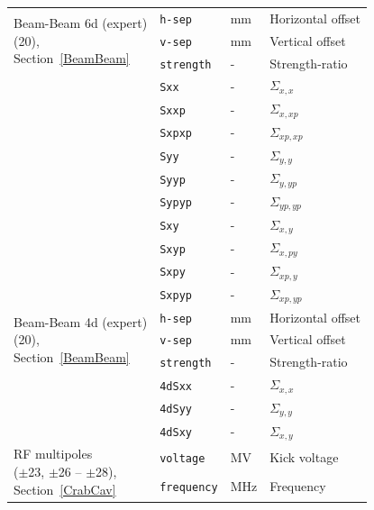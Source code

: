 \begin{longtable}{|l | l | l | p{6cm}|}
   \multirow{3}{*}{\parbox{4cm}{Beam-Beam 6d (expert) \\ (20),\\ Section~\ref{BeamBeam}}}
    & \texttt{h-sep}     & mm      & Horizontal offset \\
    & \texttt{v-sep}     & mm      & Vertical offset \\
    & \texttt{strength}  & -       & Strength-ratio \\
    & \texttt{Sxx}       & -       & $\Sigma_{x,x}$  \\
    & \texttt{Sxxp}      & -       & $\Sigma_{x,xp}$ \\
    & \texttt{Sxpxp}     & -       & $\Sigma_{xp,xp}$  \\
    & \texttt{Syy}       & -       & $\Sigma_{y,y}$ \\
    & \texttt{Syyp}      & -       & $\Sigma_{y,yp}$\\
    & \texttt{Sypyp}     & -       & $\Sigma_{yp,yp}$ \\
    & \texttt{Sxy}       & -       & $\Sigma_{x,y}$ \\
    & \texttt{Sxyp}      & -       & $\Sigma_{x,py}$  \\
    & \texttt{Sxpy}      & -       & $\Sigma_{xp,y}$ \\
    & \texttt{Sxpyp}     & -       & $\Sigma_{xp,yp}$ \\
   \hline
      \multirow{3}{*}{\parbox{4cm}{Beam-Beam 4d (expert) \\ (20),\\ Section~\ref{BeamBeam}}}
    & \texttt{h-sep}     & mm      & Horizontal offset \\
    & \texttt{v-sep}     & mm      & Vertical offset \\
    & \texttt{strength}  & -       & Strength-ratio \\
    & \texttt{4dSxx}     & -       & $\Sigma_{x,x}$  \\
    & \texttt{4dSyy}     & -       & $\Sigma_{y,y}$ \\
    & \texttt{4dSxy}     & -       & $\Sigma_{x,y}$ \\
  \hline
  \multirow{3}{*}{\parbox{4cm}{RF multipoles\\ ($\pm$23, $\pm$26 -- $\pm$28),\\ Section~\ref{CrabCav}}}
    & \texttt{voltage}     & MV      & Kick voltage \\
    & \texttt{frequency}   & MHz     & Frequency \\

\end{longtable}
